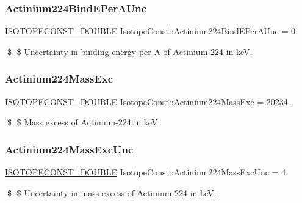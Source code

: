 \subsubsection{\texorpdfstring{Actinium224\+Bind\+E\+Per\+A\+Unc}{Actinium224BindEPerAUnc}}
{\footnotesize\ttfamily \mbox{\hyperlink{group___isotope_const-_macros_ga8f45a7272ce02c0b4c65c44636ed719a}{I\+S\+O\+T\+O\+P\+E\+C\+O\+N\+S\+T\+\_\+\+D\+O\+U\+B\+LE}} Isotope\+Const\+::\+Actinium224\+Bind\+E\+Per\+A\+Unc = 0.}

\$ \$ Uncertainty in binding energy per A of Actinium-\/224 in keV. \mbox{\label{group___isotope_const-_actinium-_ac224_gab4d68e1fd9d4e6ce4822e554324a503f}} 
\subsubsection{\texorpdfstring{Actinium224\+Mass\+Exc}{Actinium224MassExc}}
{\footnotesize\ttfamily \mbox{\hyperlink{group___isotope_const-_macros_ga8f45a7272ce02c0b4c65c44636ed719a}{I\+S\+O\+T\+O\+P\+E\+C\+O\+N\+S\+T\+\_\+\+D\+O\+U\+B\+LE}} Isotope\+Const\+::\+Actinium224\+Mass\+Exc = 20234.}

\$ \$ Mass excess of Actinium-\/224 in keV. \mbox{\label{group___isotope_const-_actinium-_ac224_ga759c3685acea304e0d39b4508e162a61}} 
\subsubsection{\texorpdfstring{Actinium224\+Mass\+Exc\+Unc}{Actinium224MassExcUnc}}
{\footnotesize\ttfamily \mbox{\hyperlink{group___isotope_const-_macros_ga8f45a7272ce02c0b4c65c44636ed719a}{I\+S\+O\+T\+O\+P\+E\+C\+O\+N\+S\+T\+\_\+\+D\+O\+U\+B\+LE}} Isotope\+Const\+::\+Actinium224\+Mass\+Exc\+Unc = 4.}

\$ \$ Uncertainty in mass excess of Actinium-\/224 in keV. \mbox{\label{group___isotope_const-_actinium-_ac224_gaba9257202c22fbe6a4d5c78243ebafcc}} 
